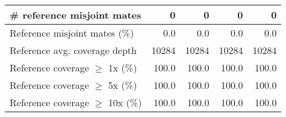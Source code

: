 \documentclass[12pt,a4paper]{article}
\begin{document}
\begin{table}[ht]
\begin{center}
\begin{tabular}{|l*{4}{|r}|}
\# reference misjoint mates & 0 & 0 & 0 & 0 \\ \hline
Reference misjoint mates (\%) & 0.0 & 0.0 & 0.0 & 0.0 \\ \hline
Reference avg. coverage depth & 10284 & 10284 & 10284 & 10284 \\ \hline
Reference coverage $\geq$ 1x (\%) & 100.0 & 100.0 & 100.0 & 100.0 \\ \hline
Reference coverage $\geq$ 5x (\%) & 100.0 & 100.0 & 100.0 & 100.0 \\ \hline
Reference coverage $\geq$ 10x (\%) & 100.0 & 100.0 & 100.0 & 100.0 \\ \hline
\end{tabular}
\end{center}
\end{table}
\end{document}
